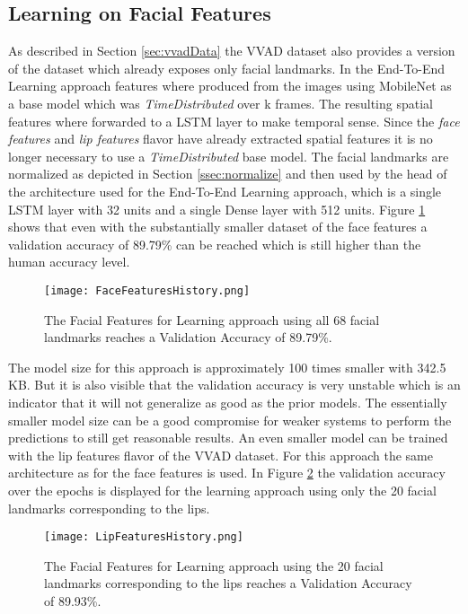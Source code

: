 \subsection{Learning on Facial Features}\label{ssec:facialFeaturesLearninig} %
As described in Section \ref{sec:vvadData} the VVAD dataset also provides a version of the dataset which already exposes only facial landmarks.
In the End-To-End Learning approach features where produced from the images using MobileNet as a base model which was \emph{TimeDistributed} over k frames.
The resulting spatial features where forwarded to a LSTM layer to make temporal sense.
Since the \emph{face features} and \emph{lip features} flavor have already extracted spatial features it is no longer necessary to use a \emph{TimeDistributed} base model.
The facial landmarks are normalized as depicted in Section \ref{ssec:normalize} and then used by the head of the architecture used for the End-To-End Learning approach, which is a single LSTM layer with 32 units and a single Dense layer with 512 units.
Figure \ref{fig:FaceFeaturesHistory} shows that even with the substantially smaller dataset of the face features a validation accuracy of 89.79\% can be reached which is still higher than the human accuracy level.

\begin{figure}
  \centering
  \texttt{[image: FaceFeaturesHistory.png]}
  \caption{The Facial Features for Learning approach using all 68 facial landmarks reaches a Validation Accuracy of 89.79\%.}
  \label{fig:FaceFeaturesHistory}
\end{figure}
The model size for this approach is approximately 100 times smaller with 342.5 KB.
But it is also visible that the validation accuracy is very unstable which is an indicator that it will not generalize as good as the prior models.
The essentially smaller model size can be a good compromise for weaker systems to perform the predictions to still get reasonable results.
An even smaller model can be trained with the lip features flavor of the VVAD dataset.
For this approach the same architecture as for the face features is used.
In Figure \ref{fig:LipFeaturesHistory} the validation accuracy over the epochs is displayed for the learning approach using only the 20 facial landmarks corresponding to the lips.

\begin{figure}
  \centering
  \texttt{[image: LipFeaturesHistory.png]}
  \caption{The Facial Features for Learning approach using the 20 facial landmarks corresponding to the lips reaches a Validation Accuracy of 89.93\%.}
  \label{fig:LipFeaturesHistory}
\end{figure}

